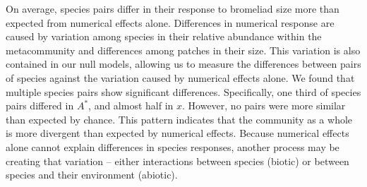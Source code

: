 On average, species pairs differ in their response to bromeliad size
more than expected from numerical effects alone. Differences in
numerical response are caused by variation among species in their
relative abundance within the metacommunity and differences among
patches in their size. This variation is also contained in our null
models, allowing us to measure the differences between pairs of species
against the variation caused by numerical effects alone. We found that
multiple species pairs show significant differences. Specifically, one
third of species pairs differed in \(A^{*}\), and almost half in \(x\).
However, no pairs were more similar than expected by chance. This
pattern indicates that the community as a whole is more divergent than
expected by numerical effects. Because numerical effects alone cannot
explain differences in species responses, another process may be
creating that variation -- either interactions between species (biotic)
or between species and their environment (abiotic).


